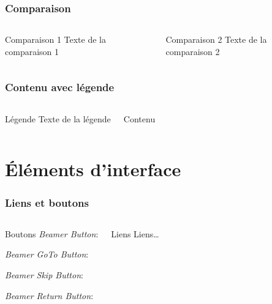 \documentclass[aspectratio=1610,compress,t,gabarita,english,french]{hecppt}
\begin{document}
\begin{frame}
\frametitle{Comparaison}
\begin{columns}
	\begin{HECcomparaison}{Comparaison 1}
		Texte de la comparaison 1
	\end{HECcomparaison}

	\begin{HECcomparaison}{Comparaison 2}
		Texte de la comparaison 2
	\end{HECcomparaison}
\end{columns}
\end{frame}

\begin{frame}
\frametitle{Contenu avec légende}
\begin{columns}
	\begin{HEClegende}{Légende}
		Texte de la légende
	\end{HEClegende}
	\begin{HECcontenuLegende}
		Contenu
	\end{HECcontenuLegende}
\end{columns}
\end{frame}

\section{Éléments d'interface}
\hypertarget{elementsInterface}{}

\begin{frame}
\frametitle{Liens et boutons}
	\begin{columns}
		\begin{HECcomparaison}{Boutons}
			\emph{Beamer Button}:\\			
			\hyperlink{paletteCouleurs}{}
			
			\emph{Beamer GoTo Button}:\\
			\hyperlink{structureDiapos}{}
			
			\emph{Beamer Skip Button}:\\
			\hyperlink{elementsInterface}{}
			
			\emph{Beamer Return Button}:\\
			\hyperlink{tdm}{}
		\end{HECcomparaison}
		\begin{HECcomparaison}{Liens}
			Liens\ldots
		\end{HECcomparaison}
	\end{columns}

\end{frame}
\end{document}
